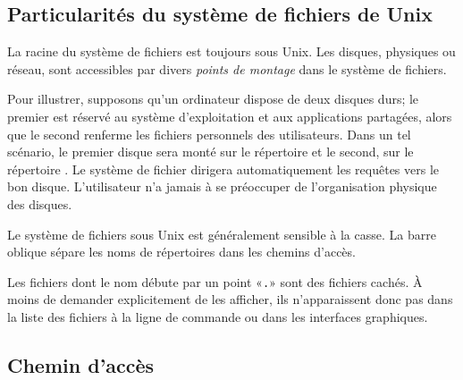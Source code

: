 \subsection{Particularités du système de fichiers de Unix}
\label{sec:informatique:fs:unix}

La racine du système de fichiers est toujours \code{/} sous
Unix. Les disques, physiques ou réseau, sont accessibles
par divers \emph{points de montage} dans le système de fichiers.

Pour illustrer, supposons qu'un ordinateur dispose de deux disques
durs; le premier est réservé au système d'exploitation et aux
applications partagées, alors que le second renferme les fichiers
personnels des utilisateurs. Dans un tel scénario, le premier disque
sera monté sur le répertoire \code{/} et le second, sur le répertoire
. Le système de fichier dirigera automatiquement les
requêtes vers le bon disque. L'utilisateur n'a jamais à se préoccuper
de l'organisation physique des disques.


Le système de fichiers sous Unix est généralement sensible à la casse.
La barre oblique \code{/} sépare les noms de répertoires dans les
chemins d'accès.

Les fichiers dont le nom débute par un point «\verb=.=» sont des
fichiers cachés. À moins de demander explicitement de les afficher,
ils n'apparaissent donc pas dans la liste des fichiers à la ligne de
commande ou dans les interfaces graphiques.

\subsection{Chemin d'accès}
\label{sec:informatique:fs:path}

